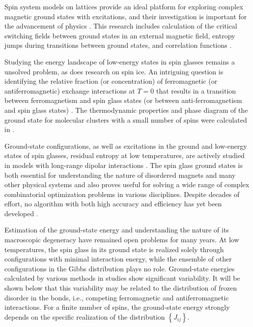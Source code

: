 \documentclass[preprint,12pt]{elsarticle}
\begin{document}
	Spin system models on lattices provide an ideal platform for exploring complex magnetic ground states with excitations, and their investigation is important for the advancement of physics \cite{lacroix2011introduction}. This research includes calculation of the critical switching fields between ground states in an external magnetic field, entropy jumps during transitions between ground states, and correlation functions \cite{ramirez2004effect, rosas2004random, andriushchenko2019large}.  
	
	Studying the energy landscape of low-energy states in spin glasses \cite{biswas2023energy} remains a unsolved problem, as does research on spin ice. An intriguing question is identifying the relative fraction (or concentration) of ferromagnetic (or antiferromagnetic) exchange interactions at $T=0$ that results in a transition between ferromagnetism and spin glass states (or between anti-ferromagnetism and spin glass states) \cite{gruzberg2001random, honecker2001universality, picco2006strong, tsomokos2011interplay, zimmer2022role}. The thermodynamic properties and phase diagram of the ground state for molecular clusters with a small number of spins were calculated in \cite{dias2023ground}.
	
	Ground-state configurations, as well as excitations in the ground and low-energy states of spin glasses, residual entropy at low temperatures, are actively studied in models with long-range dipolar interactions \cite{makarova2021low, singh2024micromagnetic}. The spin glass ground states is both essential for understanding the nature of disordered magnets and many other physical systems and also proves useful for solving a wide range of complex combinatorial optimization problems in various disciplines. Despite decades of effort, no algorithm with both high accuracy and efficiency has yet been developed \cite{fan2023searching}.  
	
	Estimation of the ground-state energy and understanding the nature of its macroscopic degeneracy have remained open problems for many years. At low temperatures, the spin glass in its ground state is realized solely through configurations with minimal interaction energy, while the ensemble of other configurations in the Gibbs distribution plays no role. Ground-state energies calculated by various methods in studies \cite{thouless1977solution, sherrington1975solvable, tanaka1980analytic, klein1976comparison, kirkpatrick1978infinite, karandashev2019global, palmer1999ground, campbell2004energy, roma2009ground} show significant variability. It will be shown below that this variability may be related to the distribution of frozen disorder in the bonds, i.e., competing ferromagnetic and antiferromagnetic interactions. For a finite number of spins, the ground-state energy strongly depends on the specific realization of the distribution $\left\lbrace J_{ij} \right\rbrace$.  
	
\end{document}
